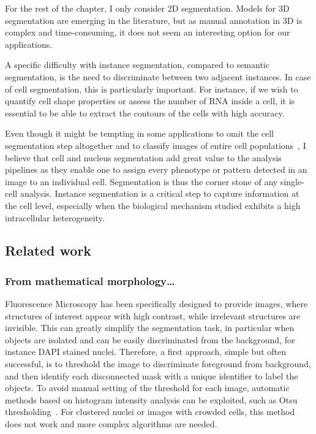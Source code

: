 For the rest of the chapter, I only consider 2D segmentation.
Models for 3D segmentation are emerging in the literature, but as manual annotation in 3D is complex and time-consuming, it does not seem an interesting option for our applications.

A specific difficulty with instance segmentation, compared to semantic segmentation, is the need to discriminate between two adjacent instances.
In case of cell segmentation, this is particularly important.
For instance, if we wish to quantify cell shape properties or assess the number of \ac{RNA} inside a cell, it is essential to be able to extract the contours of the cells with high accuracy.

Even though it might be tempting in some applications to omit the cell segmentation step altogether and to classify images of entire cell populations~\cite{Godinez2017}, I believe that cell and nucleus segmentation add great value to the analysis pipelines as they enable one to assign every phenotype or pattern detected in an image to an individual cell.
Segmentation is thus the corner stone of any single-cell analysis.
Instance segmentation is a critical step to capture information at the cell level, especially when the biological mechanism studied exhibits a high intracellular heterogeneity.

\subsection{Related work}
\label{subsec:segmentation_related_work}

\subsubsection{From mathematical morphology\dots}

Fluorescence Microscopy has been specifically designed to provide images, where structures of interest appear with high contrast, while irrelevant structures are invisible.
This can greatly simplify the segmentation task, in particular when objects are isolated and can be easily discriminated from the background, for instance DAPI stained nuclei.
Therefore, a first approach, simple but often successful, is to threshold the image to discriminate foreground from background, and then identify each disconnected mask with a unique identifier to label the objects.
To avoid manual setting of the threshold for each image, automatic methods based on histogram intensity analysis can be exploited, such as Otsu thresholding~\cite{Otsu_1979}.
For clustered nuclei or images with crowded cells, this method does not work and more complex algorithms are needed.

